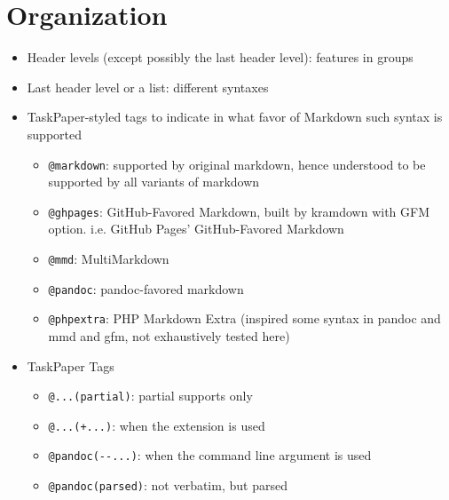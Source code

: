 \section{Organization}
\label{organization}

\begin{itemize}
\item Header levels (except possibly the last header level): features in groups

\item Last header level or a list: different syntaxes

\item TaskPaper-styled tags to indicate in what favor of Markdown such syntax is supported

\begin{itemize}
\item \texttt{@markdown}: supported by original markdown, hence understood to be supported by all variants of markdown

\item \texttt{@ghpages}: GitHub-Favored Markdown, built by kramdown with GFM option. i.e. GitHub Pages' GitHub-Favored Markdown

\item \texttt{@mmd}: MultiMarkdown 

\item \texttt{@pandoc}: pandoc-favored markdown

\item \texttt{@phpextra}: PHP Markdown Extra (inspired some syntax in pandoc and mmd and gfm, not exhaustively tested here)

\end{itemize}

\item TaskPaper Tags

\begin{itemize}
\item \texttt{@...(partial)}: partial supports only

\item \texttt{@...(+...)}: when the extension is used

\item \texttt{@pandoc(-{}-...)}: when the command line argument is used

\item \texttt{@pandoc(parsed)}: not verbatim, but parsed

\end{itemize}

\end{itemize}


